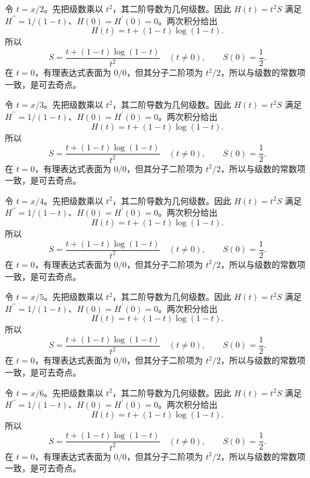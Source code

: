 \documentclass[UTF8,12pt,a4paper,fontset=fandol]{ctexart}
\begin{document}
\begin{solve}\label{ans:c27q14}
令 $t=x/2$。先把级数乘以 $t^2$，其二阶导数为几何级数。因此 $H(t)=t^2S$ 满足 $H^{\prime\prime}=1/(1-t)$、$H(0)=H^{\prime}(0)=0$。两次积分给出
\[
H(t)=t+(1-t)\log(1-t).
\]
所以
\[
S=\frac{t+(1-t)\log(1-t)}{t^2}\quad(t\ne0),\qquad S(0)=\frac12.
\]
在 $t=0$，有理表达式表面为 $0/0$，但其分子二阶项为 $t^2/2$，所以与级数的常数项一致，是可去奇点。
\end{solve}

\begin{solve}\label{ans:c27q15}
令 $t=x/3$。先把级数乘以 $t^2$，其二阶导数为几何级数。因此 $H(t)=t^2S$ 满足 $H^{\prime\prime}=1/(1-t)$、$H(0)=H^{\prime}(0)=0$。两次积分给出
\[
H(t)=t+(1-t)\log(1-t).
\]
所以
\[
S=\frac{t+(1-t)\log(1-t)}{t^2}\quad(t\ne0),\qquad S(0)=\frac12.
\]
在 $t=0$，有理表达式表面为 $0/0$，但其分子二阶项为 $t^2/2$，所以与级数的常数项一致，是可去奇点。
\end{solve}

\begin{solve}\label{ans:c27q16}
令 $t=x/4$。先把级数乘以 $t^2$，其二阶导数为几何级数。因此 $H(t)=t^2S$ 满足 $H^{\prime\prime}=1/(1-t)$、$H(0)=H^{\prime}(0)=0$。两次积分给出
\[
H(t)=t+(1-t)\log(1-t).
\]
所以
\[
S=\frac{t+(1-t)\log(1-t)}{t^2}\quad(t\ne0),\qquad S(0)=\frac12.
\]
在 $t=0$，有理表达式表面为 $0/0$，但其分子二阶项为 $t^2/2$，所以与级数的常数项一致，是可去奇点。
\end{solve}

\begin{solve}\label{ans:c27q17}
令 $t=x/5$。先把级数乘以 $t^2$，其二阶导数为几何级数。因此 $H(t)=t^2S$ 满足 $H^{\prime\prime}=1/(1-t)$、$H(0)=H^{\prime}(0)=0$。两次积分给出
\[
H(t)=t+(1-t)\log(1-t).
\]
所以
\[
S=\frac{t+(1-t)\log(1-t)}{t^2}\quad(t\ne0),\qquad S(0)=\frac12.
\]
在 $t=0$，有理表达式表面为 $0/0$，但其分子二阶项为 $t^2/2$，所以与级数的常数项一致，是可去奇点。
\end{solve}

\begin{solve}\label{ans:c27q18}
令 $t=x/6$。先把级数乘以 $t^2$，其二阶导数为几何级数。因此 $H(t)=t^2S$ 满足 $H^{\prime\prime}=1/(1-t)$、$H(0)=H^{\prime}(0)=0$。两次积分给出
\[
H(t)=t+(1-t)\log(1-t).
\]
所以
\[
S=\frac{t+(1-t)\log(1-t)}{t^2}\quad(t\ne0),\qquad S(0)=\frac12.
\]
在 $t=0$，有理表达式表面为 $0/0$，但其分子二阶项为 $t^2/2$，所以与级数的常数项一致，是可去奇点。
\end{solve}
\end{document}
